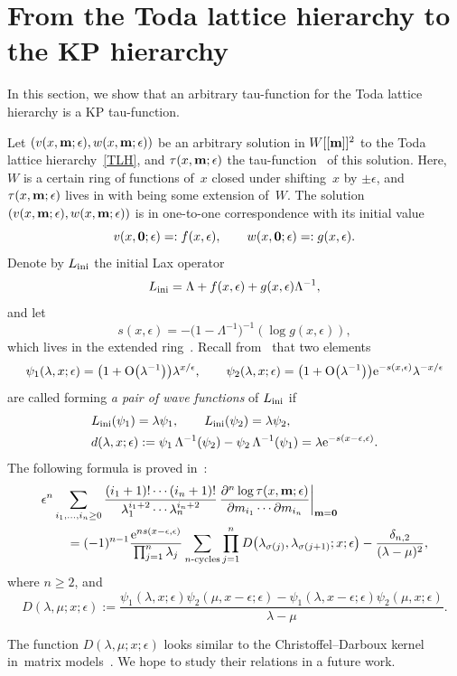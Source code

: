 \documentclass[pdftex]{sigma}
\newcommand{\e}{\epsilon}
\newcommand{\p}{\partial}
\newcommand{\nn}{\nonumber}
\newcommand{\beq}{\begin{equation}}
\newcommand{\eeq}{\end{equation}}
\numberwithin{equation}{section}
\begin{document}
\section{From the Toda lattice hierarchy to the KP hierarchy}\label{sectionToda}
In this section, we show that an arbitrary tau-function for the Toda lattice hierarchy is a KP tau-function.

Let $(v(x,{\bf m};\e), w(x,{\bf m};\e))$ be an arbitrary solution in $W[[{\bf m}]]^2$
to the Toda lattice hierarchy~\eqref{TLH}, and $\tau(x,{\bf m};\e)$ the tau-function~\cite{CDZ, DY, DZ-toda} of this solution.
Here, $W$ is a certain ring of functions of~$x$ closed under shifting~$x$
by $\pm \e$, and $\tau(x,{\bf m};\e)$ lives in  with  being some extension of~$W$.
The solution $(v(x,{\bf m};\e), w(x,{\bf m};\e))$ is in one-to-one correspondence
with its initial value
\[
v(x,{\bf 0};\e)=:f(x,\e), \qquad w(x,{\bf 0}; \e)=:g(x,\e).
\]
Denote by $L_{\rm ini}$ the initial Lax operator
\[
L_{\rm ini}=\Lambda+f(x,\e) + g(x,\e)\Lambda^{-1},
\]
and let
\[
s(x,\e) = - \bigl(1-\Lambda^{-1}\bigr)^{-1} (\log g(x,\e)),
\]
which lives in the extended ring~.
Recall from~\cite{Y} that two elements
\[
 \psi_1(\lambda,x;\e) = \bigl(1+{\rm O}\bigl(\lambda^{-1}\bigr)\bigr)\lambda^{x/\e}, \qquad
\psi_2(\lambda,x;\e)=\bigl(1+{\rm O}\bigl(\lambda^{-1}\bigr)\bigr){\rm e}^{-s(x,\e)}\lambda^{-x/\e}
\]
are called forming {\it a pair of wave functions} of $L_{\rm ini}$ if
\begin{align*}%
& L_{\rm ini} (\psi_1) = \lambda \psi_1, \qquad L_{\rm ini} (\psi_2) = \lambda \psi_2,\\
& d(\lambda,x;\e):= \psi_1 \, \Lambda^{-1}(\psi_2) - \psi_2 \, \Lambda^{-1}(\psi_1) = \lambda {\rm e}^{-s(x-\e,\e)}.
\end{align*}
The following formula is proved in~\cite{Y}:
\begin{align}
& \e^n \sum_{i_1,\dots,i_n\ge0}
\frac{(i_1+1)! \cdots (i_n+1)!} {\lambda_1^{i_1+2}\cdots \lambda_n^{i_n+2}} \,
\frac{\p^n \log \tau(x,{\bf m};\e)}{\p m_{i_1} \cdots \p m_{i_n}}\bigg|_{{\bf m}={\bf 0}}\nn\\
&\qquad{}= (-1)^{n-1} \frac{{\rm e}^{n s(x-\e,\e)}}{\prod_{j=1}^n \lambda_j} \sum_{\text{$n$-cycles}}
\prod_{j=1}^n D\bigl(\lambda_{\sigma(j)},\lambda_{\sigma(j+1)}; x;\e\bigr) - \frac{\delta_{n,2}}{(\lambda-\mu)^2},\label{Y421}
\end{align}
where $n\ge2$, and
\beq\label{dpsiabtoda}
D(\lambda,\mu; x;\e) := \frac{\psi_1(\lambda,x;\e) \psi_2(\mu,x-\e;\e) - \psi_1(\lambda,x-\e;\e) \psi_2(\mu,x;\e)}{\lambda-\mu}.
\eeq
\begin{Remark}
The function $D(\lambda,\mu; x;\e)$ looks similar to the
Christoffel--Darboux kernel in~matrix models~\cite{Deift, Mehta}.
We hope to study their relations in a future work.
\end{Remark}
\end{document}
